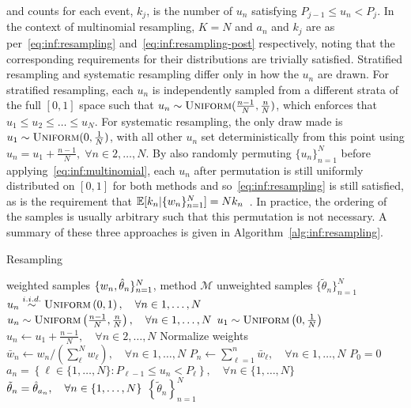 and counts for each event, $k_j$, is the number of $u_n$ satisfying $P_{j-1} \le u_n < P_j$.
In the context of multinomial resampling, $K=N$ and $a_n$ and $k_j$ are as per~\eqref{eq:inf:resampling}
and~\eqref{eq:inf:resampling-post} respectively, noting that the corresponding requirements
for their distributions are trivially satisfied.
Stratified resampling and systematic resampling differ only in how the $u_n$ are drawn. 
For stratified resampling, each $u_n$ is independently sampled from a different strata of the full
$[0,1]$ space such that $u_n \sim \textsc{Uniform}(\frac{n-1}{N},\frac{n}{N})$, which enforces
that $u_1 \le u_2 \le \dots \le u_N$.  For systematic resampling, the only draw made is
$u_1 \sim \textsc{Uniform}(0,\frac{1}{N})$, with all other $u_n$ set deterministically from this
point using $u_n = u_1+\frac{n-1}{N}, \; \forall n\in2,\dots,N$.
By also randomly permuting $\{u_{n}\}_{n=1}^N$ before
applying~\eqref{eq:inf:multinomial}, each $u_n$ after permutation is still 
uniformly distributed on $[0,1]$ for both methods and so~\eqref{eq:inf:resampling} is still satisfied, 
as is the requirement that $\mathbb{E}[k_n | \{w_n\}_{n=1}^N] = Nk_n$~\citep{douc2005comparison}.
In practice, the ordering of the samples is usually arbitrary such that this permutation is not necessary.
A summary of these three approaches is given in Algorithm~\ref{alg:inf:resampling}.

\begin{algorithm}[tb]
	\caption{Resampling}
	\label{alg:inf:resampling}
	\begin{spacing}{1.2}
		\begin{algorithmic}[1]
			\renewcommand{\algorithmicrequire}{\textbf{Inputs:}}
			\renewcommand{\algorithmicensure}{\textbf{Outputs:}}				 
			\Require weighted samples $\{w_n,\hat{\theta}_n\}_{n=1}^N$, method $\mathcal{M}$
			\Ensure unweighted samples $\{\tilde{\theta}_n\}_{n=1}^N$
			\State $u_n \overset{i.i.d.}{\sim} \textsc{Uniform}\left(0,1\right), \quad \forall n\in1,\dots,N$ \vspace{-3pt}
			\EndCase
			\State $u_n \sim \textsc{Uniform}\left(\frac{n-1}{N},\frac{n}{N}\right), \quad \forall n\in1,\dots,N$
			\vspace{-3pt}
			\EndCase
			\State $u_1 \sim  \textsc{Uniform}\left(0,\frac{1}{N}\right)$
			\State $u_n \leftarrow u_1+\frac{n-1}{N}, \quad \forall n\in2,\dots,N$ \vspace{-3pt}
			\EndCase
			\EndSwitch
			\State Normalize weights $\bar{w}_n \leftarrow w_n/\left(\sum_{\ell}^N w_{\ell}\right), 
						\quad \forall n \in 1,\dots,N$
			\State $P_n \leftarrow \sum_{\ell=1}^n \bar{w}_{\ell}, \quad \forall n\in1,\dots,N$
			\Comment $P_0 =0$
			\State $a_n = \left\{\ell \in \{1,\dots,N\} \colon P_{\ell-1} \le u_n < P_\ell\right\}, \quad \forall n \in \{1,\dots,N\}$
			\State $\tilde{\theta}_n = \hat{\theta}_{a_n}, \quad \forall n \in \{1,\dots,N\}$
			\State \Return $\left\{\tilde{\theta}_n\right\}_{n=1}^N$
		\end{algorithmic}
	\end{spacing}
\end{algorithm}


